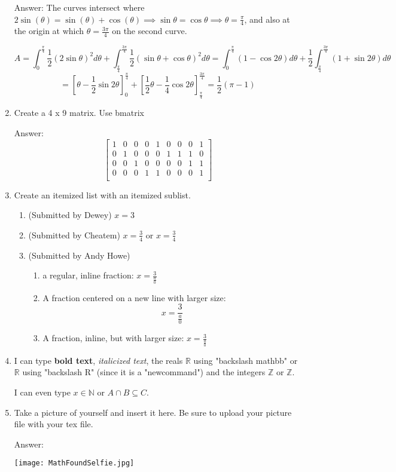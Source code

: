 \documentclass{article}
\begin{document}
\begin{enumerate}
Answer:
The curves intersect where $2\sin(\theta)=\sin(\theta)+\cos(\theta)\implies \sin\theta=\cos\theta\implies\theta=\frac{\pi}{4}$, and also at the origin at which $\theta=\frac{3\pi}{4}$ on the second curve.

$$A=\int_{0}^{\frac{\pi}{4}}\frac{1}{2}(2\sin\theta)^2 d\theta+\int_{\frac{\pi}{4}}^{\frac{3\pi}{4}}\frac{1}{2}(\sin\theta+\cos\theta)^2 d\theta = \int_{0}^{\frac{\pi}{4}}(1-\cos2\theta) d\theta+\frac{1}{2}\int_{\frac{\pi}{4}}^{\frac{3\pi}{4}}(1+\sin2\theta) d\theta $$ 
$$ = [\theta-\frac{1}{2}\sin2\theta]^{\frac{\pi}{4}}_0+[\frac{1}{2}\theta-\frac{1}{4}\cos2\theta]^{\frac{3\pi}{4}}_{\frac{\pi}{4}} = \frac{1}{2}(\pi-1)$$

\item
Create a 4 x 9 matrix. Use bmatrix

Answer:
$$\begin{bmatrix}
    1 & 0 & 0 & 0 & 1 & 0 & 0 & 0 & 1 \\
    0 & 1 & 0 & 0 & 0 & 1 & 1 & 1 & 0 \\
    0 & 0 & 1 & 0 & 0 & 0 & 0 & 1 & 1 \\
    0 & 0 & 0 & 1 & 1 & 0 & 0 & 0 & 1 \\
    \end{bmatrix}$$
    
\item
Create an itemized list with an itemized sublist.

    \begin{enumerate}
        \item (Submitted by Dewey) $x=3$
        \item (Submitted by Cheatem) $x=\frac{3}{4}$ or $x=\frac{3}{4}$
        \item (Submitted by Andy Howe)
        \begin{enumerate}
            \item a regular, inline fraction: $x=\frac{3}{\frac{a}{0}}$
            \item A fraction centered on a new line with larger size:
            \large$$x=\frac{3}{\frac{a}{0}}$$
            \item A fraction, inline, but with larger size: \large$x=\frac{3}{\frac{a}{0}}$
    \end{enumerate}
   \end{enumerate}

    
\item I can type \textbf{bold text}, \textit{italicized text}, the reals $\mathbb{R}$ using "backslash mathbb" or $\mathbb{R}$ using "backslash R" (since it is a "newcommand") and the integers $\mathbb{Z}$ or $\mathbb{Z}$.

I can even type $x\in\mathbb{N}$ or $A\cap B\subseteq C$.

\item Take a picture of yourself and insert it here. Be sure to upload your picture file with your tex file.

Answer:

\texttt{[image: MathFoundSelfie.jpg]}



\end{enumerate}
\end{document}
